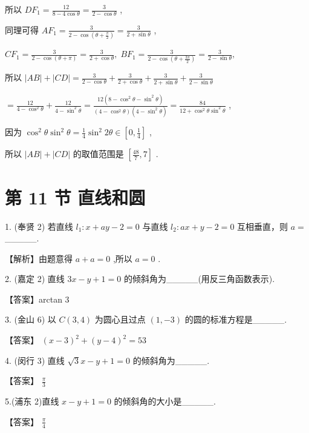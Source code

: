 \documentclass[10pt]{article}
\begin{document}
所以 \(D{F}_{1} = \frac{12}{8 - 4\cos \theta } = \frac{3}{2 - \cos \theta }\) ,

同理可得 \(A{F}_{1} = \frac{3}{2 - \cos \left( {\theta  + \frac{\pi }{2}}\right) } = \frac{3}{2 + \sin \theta }\) ,

\(C{F}_{1} = \frac{3}{2 - \cos \left( {\theta  + \pi }\right) } = \frac{3}{2 + \cos \theta },\;B{F}_{1} = \frac{3}{2 - \cos \left( {\theta  + \frac{3\pi }{2}}\right) } = \frac{3}{2 - \sin \theta },\)

所以 \(\left| {AB}\right|  + \left| {CD}\right|  = \frac{3}{2 - \cos \theta } + \frac{3}{2 + \cos \theta } + \frac{3}{2 + \sin \theta } + \frac{3}{2 - \sin \theta }\)

\(= \frac{12}{4 - {\cos }^{2}\theta } + \frac{12}{4 - {\sin }^{2}\theta } = \frac{{12}\left( {8 - {\cos }^{2}\theta  - {\sin }^{2}\theta }\right) }{\left( {4 - {\cos }^{2}\theta }\right) \left( {4 - {\sin }^{2}\theta }\right) } = \frac{84}{{12} + {\cos }^{2}\theta {\sin }^{2}\theta }\) ,

因为 \({\cos }^{2}\theta {\sin }^{2}\theta  = \frac{1}{4}{\sin }^{2}{2\theta } \in  \left\lbrack  {0,\frac{1}{4}}\right\rbrack\) ,

所以 \(\left| {AB}\right|  + \left| {CD}\right|\) 的取值范围是 \(\left\lbrack  {\frac{48}{7},7}\right\rbrack\) .

\section*{第 11 节 直线和圆}

1. (奉贤 2) 若直线 \({l}_{1} : x + {ay} - 2 = 0\) 与直线 \({l}_{2} : {ax} + y - 2 = 0\) 互相垂直，则 \(a =\) \_\_\_\_\_.

【解析】由题意得 \(a + a = 0\) ,所以 \(a = 0\) .

2. (嘉定 2) 直线 \({3x} - y + 1 = 0\) 的倾斜角为\_\_\_\_\_(用反三角函数表示).

【答案】arctan 3

3. (金山 6) 以 \(C\left( {3,4}\right)\) 为圆心且过点 \(\left( {1, - 3}\right)\) 的圆的标准方程是\_\_\_\_\_.

【答案】 \({\left( x - 3\right) }^{2} + {\left( y - 4\right) }^{2} = {53}\)

4. (闵行 3) 直线 \(\sqrt{3}x - y + 1 = 0\) 的倾斜角为\_\_\_\_\_.

【答案】 \(\frac{\pi }{3}\)

5.(浦东 2)直线 \(x - y + 1 = 0\) 的倾斜角的大小是\_\_\_\_\_.

【答案】 \(\frac{\pi }{4}\)
\end{document}
